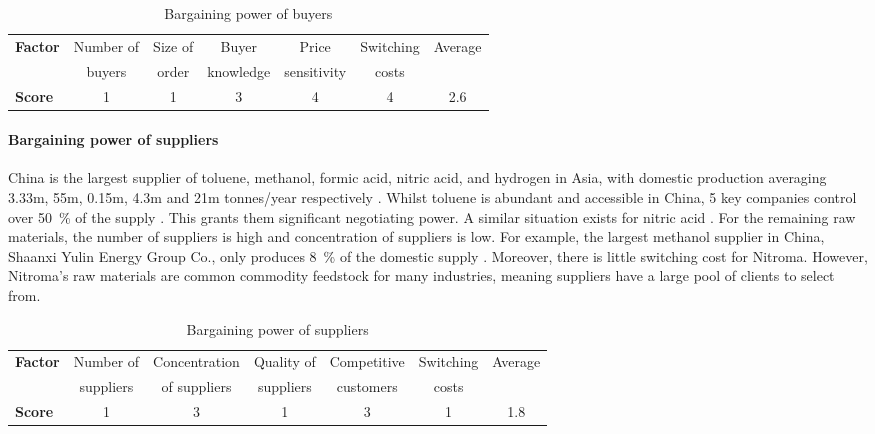 \begin{table}[H]
\centering
\caption{Bargaining power of buyers}
\label{tab:substitute-products}
\begin{tabular}{lcccccc}
\toprule
\multirow{2}{*}{\textbf{Factor}} & Number of    & Size of   & Buyer          & Price          & Switching & Average  \\
                                 & buyers       & order     & knowledge      & sensitivity    & costs     &          \\\midrule
\textbf{Score}                   & 1            & 1         & 3              & 4              & 4         & 2.6       \\\bottomrule
\end{tabular}%
\end{table}

\paragraph{Bargaining power of suppliers}
China is the largest supplier of toluene, methanol, formic acid, nitric acid, and hydrogen in Asia, with domestic production averaging 3.33m, 55m, 0.15m, 4.3m and 21m tonnes/year respectively \cite{ccm_data_market_2015,yap_chemical_2018,guo_chemical_2016,icis_explore_chemical_nodate,jianjun_prospects_2020}. Whilst toluene is abundant and accessible in China, 5 key companies control over \SI{50}{\percent} of the supply \cite{yap_chemical_2018}. This grants them significant negotiating power. A similar situation exists for nitric acid \cite{guo_chemical_2016}. For the remaining raw materials, the number of suppliers is high and concentration of suppliers is low. For example, the largest methanol supplier in China, Shaanxi Yulin Energy Group Co., only produces \SI{8}{\percent} of the domestic supply \cite{icis_explore_chemical_nodate}. Moreover, there is little switching cost for Nitroma. However, Nitroma’s raw materials are common commodity feedstock for many industries, meaning suppliers have a large pool of clients to select from.

\begin{table}[H]
\centering
\caption{Bargaining power of suppliers}
\label{tab:supplier-power}
\begin{tabular}{lcccccc}
\toprule
\multirow{2}{*}{\textbf{Factor}} & Number of        & Concentration    & Quality of       & Competitive      & Switching     & Average   \\
                                 & suppliers        & of suppliers     & suppliers        & customers        & costs                     \\\midrule
\textbf{Score}                   & 1                & 3                & 1                & 3                & 1             & 1.8       \\\bottomrule
\end{tabular}%
\end{table}


